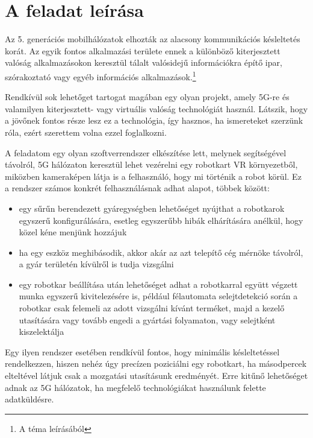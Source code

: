\documentclass[11pt,a4paper,oneside]{article}
\author{\vikszerzo}
\title{\viktitle}
\begin{document}


\onehalfspacing

\clearpage
\singlespacing

\tableofcontents

\clearpage
\singlespacing
{}

\section{A feladat leírása}

Az 5. generációs mobilhálózatok elhozták az alacsony kommunikációs késleltetés korát. Az egyik fontos alkalmazási területe ennek a különböző kiterjesztett valóság alkalmazásokon keresztül tálalt valósidejű információkra építő ipar, szórakoztató vagy egyéb információs alkalmazások.\footnote{A téma leírásából}

Rendkívül sok lehetőget tartogat magában egy olyan projekt, amely 5G-re és valamilyen kiterjesztett- vagy virtuális valóság technológiát használ. Látszik, hogy a jövőnek fontos része lesz ez a technológia, így hasznos, ha ismereteket szerzünk róla, ezért szerettem volna ezzel foglalkozni.

A feladatom egy olyan szoftverrendszer elkészítése lett, melynek segítségével távolról, 5G hálózaton keresztül lehet vezérelni egy robotkart VR környezetből, miközben kameraképen látja is a felhasználó, hogy mi történik a robot körül. Ez a rendszer számos konkrét felhasználásnak adhat alapot, többek között:
\begin{itemize}
  \item egy sűrűn berendezett gyáregységben lehetőséget nyújthat a robotkarok egyszerű konfigurálására, esetleg egyszerűbb hibák elhárítására anélkül, hogy közel kéne menjünk hozzájuk
  \item ha egy eszköz meghibásodik, akkor akár az azt telepítő cég mérnöke távolról, a gyár területén kívülről is tudja vizsgálni
  \item egy robotkar beállítása után lehetőséget adhat a robotkarral együtt végzett munka egyszerű kivitelezésére is, például félautomata selejtdetekció során a robotkar csak felemeli az adott vizsgálni kívánt terméket, majd a kezelő utasítására vagy tovább engedi a gyártási folyamaton, vagy selejtként kiszelektálja
\end{itemize}

Egy ilyen rendszer esetében rendkívül fontos, hogy minimális késleltetéssel rendelkezzen, hiszen nehéz úgy precízen poziciálni egy robotkart, ha másodpercek elteltével látjuk csak a mozgatási utasításunk eredményét. Erre kitűnő lehetőséget adnak az 5G hálózatok, ha megfelelő technológiákat használunk felette adatküldésre.
\end{document}
